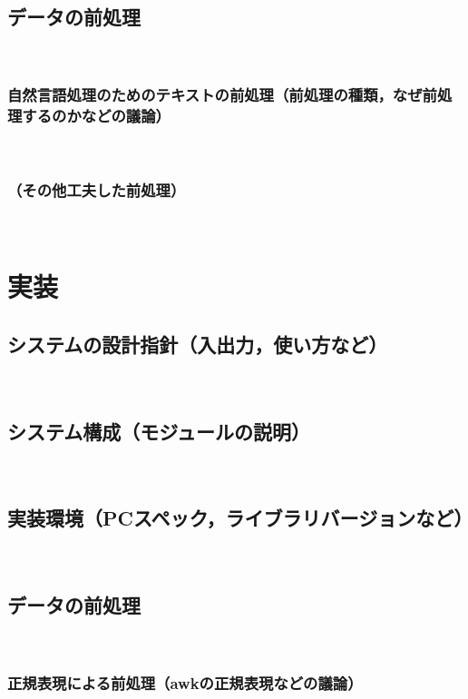 \documentclass[12pt,a4j]{jreport}
\begin{document}
~

\section{データの前処理}
~

\subsection{自然言語処理のためのテキストの前処理（前処理の種類，なぜ前処理するのかなどの議論）}
~

\subsection{（その他工夫した前処理）}
~


\chapter{実装}


\section{システムの設計指針（入出力，使い方など）}
~

\section{システム構成（モジュールの説明）}
~

\section{実装環境（PCスペック，ライブラリバージョンなど）}
~

\section{データの前処理}
~

\subsection{正規表現による前処理（awkの正規表現などの議論）}
~
\end{document}
